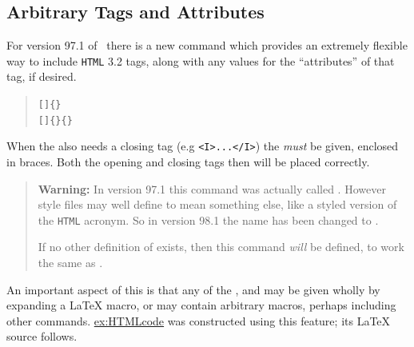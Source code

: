 \subsection{Arbitrary Tags and Attributes\label{sec:arbtags}}%
%
For version 97.1 of \latextohtml\ there is a new command which provides 
an extremely flexible way to include \texttt{HTML} 3.2 tags, along with
any values for the ``attributes'' of that tag, if desired.
\begin{quote}
\verb|[|\verb|]{|\verb|}|\label{HTMLtag}\\
\verb|[|\verb|]{|\verb|}{|\verb|}|
\end{quote}
When the  also needs a closing tag (e.g \texttt{<I>...</I>})
the  \emph{must} be given, enclosed in braces.
Both the opening and closing tags then will be placed correctly.

\smallskip
\begin{quotation}
\textbf{Warning: } 
In version 97.1 this command was actually called .
However style files may well define  to mean something else,
like a styled version of the \texttt{HTML} acronym. 
So in version 98.1 the name has been changed to .

If no other definition of  exists, then this command \emph{will}
be defined, to work the same as . 
\end{quotation}

An important aspect of this is that any of the ,
 and  may be given wholly
by expanding a \LaTeX{} macro, or may contain arbitrary macros, 
perhaps including other  commands.
\hyperref{The following table}{The contents of Figure~}{}{ex:HTMLcode} 
was constructed using this feature; its \LaTeX{} source follows.


